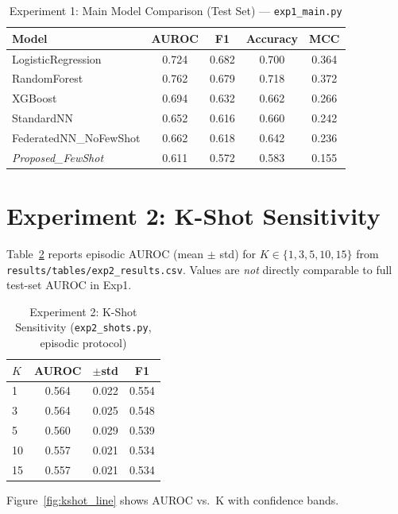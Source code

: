 \begin{table}[htbp]
\centering
\caption{Experiment 1: Main Model Comparison (Test Set) --- \texttt{exp1\_main.py}}
\small
\begin{tabular}{lcccc}
\toprule
Model & AUROC & F1 & Accuracy & MCC \\
\midrule
LogisticRegression & 0.724 & 0.682 & 0.700 & 0.364 \\
RandomForest & 0.762 & 0.679 & 0.718 & 0.372 \\
XGBoost & 0.694 & 0.632 & 0.662 & 0.266 \\
StandardNN & 0.652 & 0.616 & 0.660 & 0.242 \\
FederatedNN\_NoFewShot & 0.662 & 0.618 & 0.642 & 0.236 \\
\textit{Proposed\_FewShot} & 0.611 & 0.572 & 0.583 & 0.155 \\
\bottomrule
\end{tabular}
\label{tab:exp1}
\end{table}

\section{Experiment 2: K-Shot Sensitivity}

Table~\ref{tab:exp2} reports episodic AUROC (mean $\pm$ std) for $K \in \{1,3,5,10,15\}$ from \texttt{results/tables/exp2\_results.csv}. Values are \emph{not} directly comparable to full test-set AUROC in Exp1.

\begin{table}[htbp]
\centering
\caption{Experiment 2: K-Shot Sensitivity (\texttt{exp2\_shots.py}, episodic protocol)}
\small
\begin{tabular}{lccc}
\toprule
$K$ & AUROC & $\pm$std & F1 \\
\midrule
1 & 0.564 & 0.022 & 0.554 \\
3 & 0.564 & 0.025 & 0.548 \\
5 & 0.560 & 0.029 & 0.539 \\
10 & 0.557 & 0.021 & 0.534 \\
15 & 0.557 & 0.021 & 0.534 \\
\bottomrule
\end{tabular}
\label{tab:exp2}
\end{table}

Figure~\ref{fig:kshot_line} shows AUROC vs.\ K with confidence bands.

